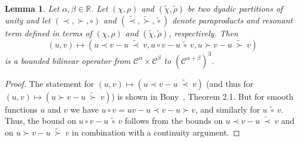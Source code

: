 \documentclass[11pt,a4paper]{article}
\newtheorem{lemma}[theorem]{Lemma}
\theoremstyle{remark}
\newcommand{\R}{\mathbb{R}}
\newcommand{\CC}{\ensuremath{\mathscr{C}}}
\begin{document}
\begin{lemma}\label{lem:paraproduct difference is bounded operator}
   Let $\alpha, \beta \in \R$. Let $( \chi, \rho )$ and $( \tilde{\chi}, \tilde{\rho} )$ be two dyadic partitions of unity and %
   let $(\prec, \succ, \circ)$ and $(\widetilde{\prec}, \widetilde{\succ}, \widetilde{\circ})$ denote paraproducts and resonant term defined in terms of $(\chi, \rho)$ and $(\tilde{\chi}, \tilde{\rho})$, respectively.
Then
   \[
      (u,v) \mapsto ( u \prec v - u \ \widetilde{\prec} \ v, u \circ v - u \ \widetilde{\circ} \ v, u \succ v - u \ \widetilde{\succ} \ v)
   \]
   is a bounded bilinear operator from $\CC^\alpha \times \CC^\beta$ to $(\CC^{\alpha+\beta})^3$.%
\end{lemma}

\begin{proof}
   The statement for $(u,v) \mapsto (u \prec v - u \ \widetilde{\prec} \ v)$ (and thus for $(u,v) \mapsto (u \succ v - u \ \widetilde{\succ} \ v)$) is shown in Bony~\cite{Bony1981}, Theorem 2.1. But for smooth functions $u$ and $v$ we have $u \circ v = uv - u \prec v - u \succ v$, and similarly for $u \ \widetilde{\circ} \ v$. Thus, the bound on $u \circ v - u \ \widetilde{\circ} \ v$ follows from the bounds on $u \prec v - u \ \widetilde{\prec} \ v$ and on $u \succ v - u \ \widetilde{\succ} \ v$ in combination with a continuity argument.
\end{proof}
\end{document}
